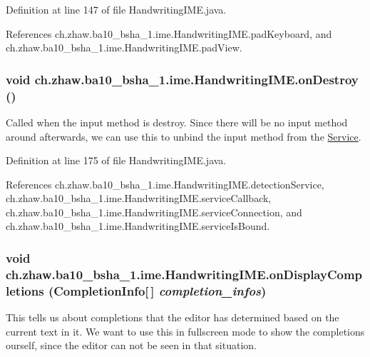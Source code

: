 Definition at line 147 of file HandwritingIME.java.

References ch.zhaw.ba10\_\-bsha\_\-1.ime.HandwritingIME.padKeyboard, and ch.zhaw.ba10\_\-bsha\_\-1.ime.HandwritingIME.padView.\hypertarget{classch_1_1zhaw_1_1ba10__bsha__1_1_1ime_1_1HandwritingIME_a35c873d879f2440e2a98e2dbca31202f}{
\subsubsection[{onDestroy}]{\setlength{\rightskip}{0pt plus 5cm}void ch.zhaw.ba10\_\-bsha\_\-1.ime.HandwritingIME.onDestroy ()}}
\label{classch_1_1zhaw_1_1ba10__bsha__1_1_1ime_1_1HandwritingIME_a35c873d879f2440e2a98e2dbca31202f}
Called when the input method is destroy. Since there will be no input method around afterwards, we can use this to unbind the input method from the \hyperlink{}{Service}. 

Definition at line 175 of file HandwritingIME.java.

References ch.zhaw.ba10\_\-bsha\_\-1.ime.HandwritingIME.detectionService, ch.zhaw.ba10\_\-bsha\_\-1.ime.HandwritingIME.serviceCallback, ch.zhaw.ba10\_\-bsha\_\-1.ime.HandwritingIME.serviceConnection, and ch.zhaw.ba10\_\-bsha\_\-1.ime.HandwritingIME.serviceIsBound.\hypertarget{classch_1_1zhaw_1_1ba10__bsha__1_1_1ime_1_1HandwritingIME_a5e02e524ed9e962644d630cc0facda16}{
\subsubsection[{onDisplayCompletions}]{\setlength{\rightskip}{0pt plus 5cm}void ch.zhaw.ba10\_\-bsha\_\-1.ime.HandwritingIME.onDisplayCompletions (CompletionInfo\mbox{[}$\,$\mbox{]} {\em completion\_\-infos})}}
\label{classch_1_1zhaw_1_1ba10__bsha__1_1_1ime_1_1HandwritingIME_a5e02e524ed9e962644d630cc0facda16}
This tells us about completions that the editor has determined based on the current text in it. We want to use this in fullscreen mode to show the completions ourself, since the editor can not be seen in that situation. 

